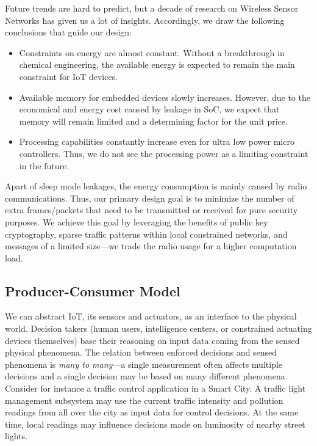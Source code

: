 \documentclass[conference]{IEEEtran}
\begin{document}
\label{trends}
Future trends are hard to predict, but a decade of research on Wireless Sensor Networks has given us a lot of insights. Accordingly, we draw the following conclusions that guide our design:
\begin{itemize}
\item Constraints on energy are almost constant. Without a breakthrough in
  chemical engineering, the available energy is expected to remain the main constraint for IoT devices. 
\item Available memory for embedded devices slowly increases. However, due to
  the economical and energy cost caused by leakage in SoC, we expect that memory
  will remain limited and a determining factor for the unit price. 
\item Processing capabilities constantly increase even for ultra low power micro
  controllers. Thus, we do not see the processing power as a limiting constraint in the future.
\end{itemize}

Apart of sleep mode leakages, the energy consumption is mainly caused by radio
communications. Thus, our primary design goal is to minimize the number of extra
frames/packets that need to be transmitted or received for pure security
purposes. We achieve this goal by leveraging the benefits of public key
cryptography, sparse traffic patterns within local constrained networks, and
messages of a limited size---we trade the radio usage for a higher computation
load. 


\subsection{Producer-Consumer Model}
\label{producer-consumer-model}
We can abstract IoT, its sensors and actuators, as an interface to the physical
world. Decision takers (human users, intelligence centers, or constrained
actuating devices themselves) base their reasoning on input data coming from the sensed physical phenomena. The relation between enforced decisions and sensed phenomena is \textit{many to many}---a single measurement often affects multiple decisions and a single decision may be based on many different phenomena.
Consider for instance a traffic control application in a Smart City.  A traffic
light management subsystem may use the current traffic intensity and pollution
readings from all over the city as input data for control decisions. At the same
time, local readings may influence decisions made on luminosity of nearby street
lights. 
\end{document}
